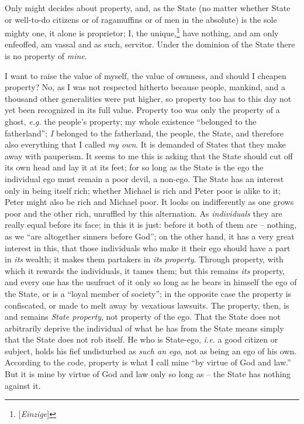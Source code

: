 \documentclass[12pt,a4paper]{book}
\begin{document}
Only might decides about property, and, as the State (no matter whether State 
or well-to-do citizens or of ragamuffins or of men in the absolute) is the 
sole mighty one, it alone is proprietor; I, the 
unique,\footnote{[\textit{Einzige}]} have nothing, and am only enfeoffed, am 
vassal and as such, servitor. Under the dominion of the State there is no 
property of \textit{mine}.

I want to raise the value of myself, the value of ownness, and should I 
cheapen property? No, as I was not respected hitherto because people, mankind, 
and a thousand other generalities were put higher, so property too has to this 
day not yet been recognized in its full value. Property too was only the 
property of a ghost, \textit{e.g.} the people's property; my whole existence 
``belonged to the fatherland''; \textit{I} belonged to the fatherland, the 
people, the State, and therefore also everything that I called \textit{my 
own}. It is demanded of States that they make away with pauperism. It seems to 
me this is asking that the State should cut off its own head and lay it at its 
feet; for so long as the State is the ego the individual ego must remain a 
poor devil, a non-ego. The State has an interest only in being itself rich; 
whether Michael is rich and Peter poor is alike to it; Peter might also be 
rich and Michael poor. It looks on indifferently as one grows poor and the 
other rich, unruffled by this alternation. As \textit{individuals} they are 
really equal before its face; in this it is just: before it both of them are 
-- nothing, as we ``are altogether sinners before God''; on the other hand, 
it has a very great interest in this, that those individuals who make it their 
ego should have a part in \textit{its} wealth; it makes them partakers in 
\textit{its property}. Through property, with which it rewards the 
individuals, it tames them; but this remains \textit{its} property, and every 
one has the usufruct of it only so long as he bears in himself the ego of the 
State, or is a ``loyal member of society''; in the opposite case the 
property is confiscated, or made to melt away by vexatious lawsuits. The 
property, then, is and remains \textit{State property}, not property of the 
ego. That the State does not arbitrarily deprive the individual of what he has 
from the State means simply that the State does not rob itself. He who is 
State-ego, \textit{i.e.} a good citizen or subject, holds his fief undisturbed 
as \textit{such an ego}, not as being an ego of his own. According to the 
code, property is what I call mine ``by virtue of God and law.'' But it is 
mine by virtue of God and law only so long as -- the State has nothing against 
it.
\end{document}
